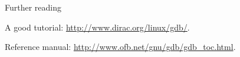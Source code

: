 
 {Further reading}

A good tutorial: \url{http://www.dirac.org/linux/gdb/}.

Reference manual: \url{http://www.ofb.net/gnu/gdb/gdb_toc.html}.


